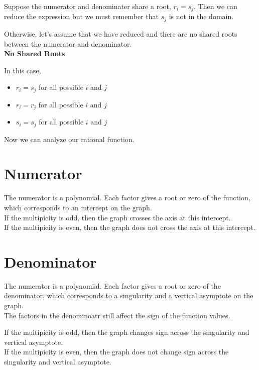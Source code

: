 \documentclass{ximera}
\begin{document}
Suppose the numerator and denominater share a root, $r_i = s_j$.  Then we can reduce the expression but we must remember that $s_j$ is not in the domain.


Otherwise, let's assume that we have reduced and there are no shared roots between the numerator and denominator. \\




\textbf{No Shared Roots}

In this case, 

\begin{itemize}
\item $r_i = s_j$ for all possible $i$ and $j$
\item $r_i = r_j$ for all possible $i$ and $j$
\item $s_i = s_j$ for all possible $i$ and $j$
\end{itemize}


Now we can analyze our rational function.



\section{Numerator}



The numerator is a polynomial.  Each factor gives a root or zero of the function, which corresponds to an intercept on the graph. \\

If the multipicity is odd, then the graph crosses the axis at this intercept.  \\
If the multipicity is even, then the graph does not cross the axis at this intercept. 






\section{Denominator}


The numerator is a polynomial.  Each factor gives a root or zero of the denominator, which corresponds to a singularity and a vertical asymptote on the graph. \\


The factors in the denominoatr still affect the sign of the function values.


If the multipicity is odd, then the graph changes sign across the singularity and vertical asymptote.  \\
If the multipicity is even, then the graph does not change sign across the singularity and vertical asymptote. 
\end{document}
